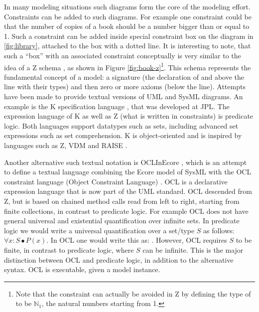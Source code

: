 In many modeling situations such diagrams form the core of the modeling effort. Constraints can be added to such diagrams.
For example one constraint could be that the number of copies of a book should be a number bigger than or equal to 1. Such a constraint can be added inside special constraint box on the diagram  in \ref{fig:library}, attached to the  box
with a dotted line. It is interesting to note, that such a ``box''
with an associated constraint conceptually is very similar to the idea of a Z schema \cite{?}, as shown in Figure \ref{fig:book-z}\footnote{Note that the constraint can actually be avoided in Z by defining the type of  to be $\mathbb{N}_1$, the natural numbers starting from 1.}.
This schema represents the fundamental concept of a model: a signature (the declaration of  and  above the line with their types) and then zero or more axioms (below the line). 
%
Attempts have been made to provide textual versions of UML and SysML diagrams. An example is  the K specification language \cite{?}, that was developed at JPL. 
The expression language of K as well as Z 
(what is written in constraints) is predicate 
logic. Both languages support datatypes such as sets, including 
advanced set expressions such as set comprehension. K is object-oriented and is inspired by languages  such as Z, VDM \cite{?} and RAISE \cite{?}. 

Another alternative such textual notation is OCLInEcore \cite{?}, which is an attempt 
to define a textual language combining the Ecore model
of SysML with the OCL constraint language (Object Constraint Language) 
\cite{?}. OCL is a declarative expression language that is now part of the UML 
standard. OCL descended from Z, but is based on chained method calls read from left to right, starting from finite collections, in contrast to predicate logic. For example OCL does not have
general universal and existential quantification over infinite sets. In predicate 
logic we would write a universal quantification over a set/type 
$S$ as follows: $\forall x : S \bullet P(x)$. In OCL one would write this as:
. However, OCL requires $S$ to be finite,
in contrast to predicate logic, where $S$ can be infinite. This
is the major distinction between OCL and predicate logic, in addition to the alternative syntax. OCL is executable, given
a model instance.



